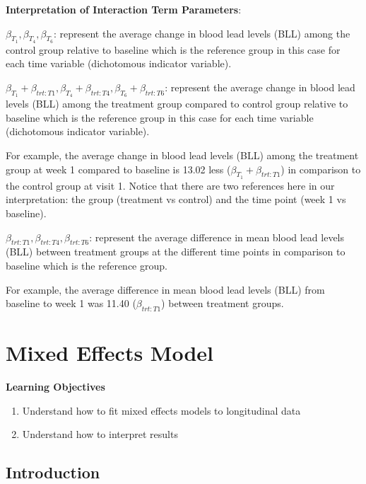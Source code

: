\documentclass[
  letterpaper,
  DIV=11,
  numbers=noendperiod]{scrreprt}
\providecommand{\tightlist}{%
  \setlength{\itemsep}{0pt}\setlength{\parskip}{0pt}}\usepackage{longtable,booktabs,array}
\begin{document}
\textbf{Interpretation of Interaction Term Parameters}:

\(\beta_{T_1}, \beta_{T_4}, \beta_{T_6}\): represent the average change
in blood lead levels (BLL) among the control group relative to baseline
which is the reference group in this case for each time variable
(dichotomous indicator variable).

\(\beta_{T_1} + \beta_{trt:T1}, \beta_{T_4} + \beta_{trt:T4}, \beta_{T_6} + \beta_{trt:T6}\):
represent the average change in blood lead levels (BLL) among the
treatment group compared to control group relative to baseline which is
the reference group in this case for each time variable (dichotomous
indicator variable).

For example, the average change in blood lead levels (BLL) among the
treatment group at week 1 compared to baseline is 13.02 less
(\(\beta_{T_1} + \beta_{trt:T1}\)) in comparison to the control group at
visit 1. Notice that there are two references here in our
interpretation: the group (treatment vs control) and the time point
(week 1 vs baseline).

\(\beta_{trt:T1}, \beta_{trt:T4}, \beta_{trt:T6}\): represent the
average difference in mean blood lead levels (BLL) between treatment
groups at the different time points in comparison to baseline which is
the reference group.

For example, the average difference in mean blood lead levels (BLL) from
baseline to week 1 was 11.40 (\(\beta_{trt:T1}\)) between treatment
groups.

\hypertarget{sec-longi-mixeffect}{%
\chapter{Mixed Effects Model}\label{sec-longi-mixeffect}}

\textbf{Learning Objectives}

\begin{enumerate}
\def\labelenumi{\arabic{enumi}.}
\tightlist
\item
  Understand how to fit mixed effects models to longitudinal data
\item
  Understand how to interpret results
\end{enumerate}

\hypertarget{introduction-1}{%
\section{Introduction}\label{introduction-1}}
\end{document}
